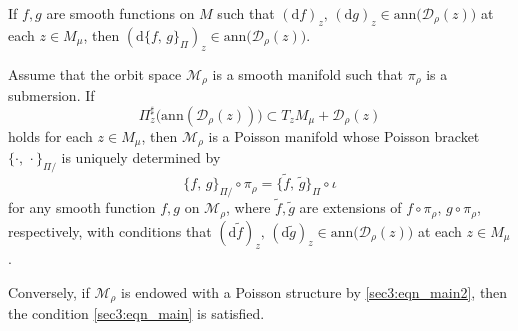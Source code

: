 \documentclass[10pt,a4paper]{amsart}
\begin{document}
\begin{prop}\label{sec3:prop_vanishing}
If $f, g$ are smooth functions on $M$ such that $(\mathrm{d}f)_z,\,(\mathrm{d}g)_z\in \mathrm{ann}\bigl(\mathcal{D}_{\rho}(z)\bigr)$ at each $z\in M_{\mu}$, then 
$(\mathrm{d}\{f,\,g\}_{\Pi})_z\in \mathrm{ann}\bigl(\mathcal{D}_{\rho}(z)\bigr)$. 
\end{prop}

\begin{thm}\label{sec3:main thm}
Assume that the orbit space $\mathcal{M}_{\rho}$ is a smooth manifold such that $\pi_{\rho}$ is a submersion. 
If 
\begin{equation}\label{sec3:eqn_main}
\Pi^{\sharp}_z\bigl(\mathrm{ann}(\mathcal{D}_{\rho}(z))\bigr) \subset T_zM_{\mu} + \mathcal{D}_{\rho}(z)
\end{equation}
holds for each $z\in M_{\mu}$, then 
$\mathcal{M}_{\rho}$ is a Poisson manifold whose Poisson bracket $\{\cdot,\,\cdot\}_{\Pi/}$ is uniquely determined by 
\begin{equation}\label{sec3:eqn_main2}
 \{f,\,g\}_{\Pi/}\circ\pi_{\rho} = \{\tilde{f},\,\tilde{g}\}_{\Pi}\circ\iota 
\end{equation}
for any smooth function $f,g$ on $\mathcal{M}_{\rho}$, where $\tilde{f},\tilde{g}$ are extensions of $f\circ\pi_{\rho},\,g\circ\pi_{\rho}$, respectively, with conditions that 
$(\mathrm{d}\tilde{f})_z,\,(\mathrm{d}\tilde{g})_z\in \mathrm{ann}\bigl(\mathcal{D}_{\rho}(z)\bigr)$ at each $z\in M_{\mu}$. 

Conversely, if $\mathcal{M}_{\rho}$ is endowed with a Poisson structure by \eqref{sec3:eqn_main2}, then the condition \eqref{sec3:eqn_main} is satisfied. 
\end{thm}
\end{document}

